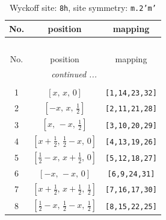 \documentclass[fleqn,8pt]{jsarticle}
\begin{document}
\begin{longtable}{ccc}
\caption{Wyckoff site: {\tt 8h}, site symmetry: {\tt m.2'm'}}
 \\
 \hline \hline
No. & position & mapping \\ \hline \endfirsthead

\multicolumn{2}{l}{\tablename\ \thetable{}} \\
 \hline \hline
No. & position & mapping \\ \hline \endhead

 \hline \hline
\multicolumn{2}{r}{\footnotesize\it continued ...} \\ \endfoot

 \hline \hline
\multicolumn{2}{r}{} \\ \endlastfoot

1 & $\left[ x,\, x,\, 0 \right]$ & {\tt [1,14,23,32]} \\ \hline
2 & $\left[ - x,\, x,\, \frac{1}{2} \right]$ & {\tt [2,11,21,28]} \\ \hline
3 & $\left[ x,\, - x,\, \frac{1}{2} \right]$ & {\tt [3,10,20,29]} \\ \hline
4 & $\left[ x + \frac{1}{2},\, \frac{1}{2} - x,\, 0 \right]$ & {\tt [4,13,19,26]} \\ \hline
5 & $\left[ \frac{1}{2} - x,\, x + \frac{1}{2},\, 0 \right]$ & {\tt [5,12,18,27]} \\ \hline
6 & $\left[ - x,\, - x,\, 0 \right]$ & {\tt [6,9,24,31]} \\ \hline
7 & $\left[ x + \frac{1}{2},\, x + \frac{1}{2},\, \frac{1}{2} \right]$ & {\tt [7,16,17,30]} \\ \hline
8 & $\left[ \frac{1}{2} - x,\, \frac{1}{2} - x,\, \frac{1}{2} \right]$ & {\tt [8,15,22,25]} \\
\end{longtable}
\renewcommand{\arraystretch}{1.2}
\end{document}
